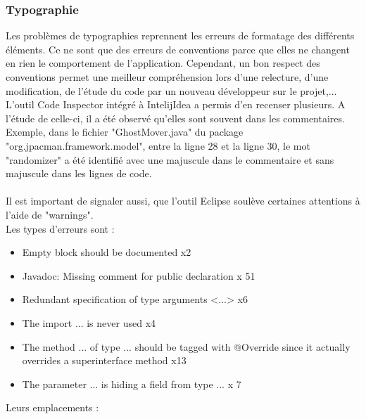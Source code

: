 \documentclass[12pt,a4paper,final]{article}
\begin{document}
\subsubsection{Typographie}
Les problèmes de typographies reprennent les erreurs de formatage des différents éléments. Ce ne sont que des erreurs de conventions parce que elles ne changent en rien le comportement de l'application. Cependant, un bon respect des conventions permet une meilleur compréhension lors d'une relecture, d'une modification, de l'étude du code par un nouveau développeur sur le projet,...\\
L'outil Code Inspector intégré à IntelijIdea a permis d'en recenser plusieurs. A l'étude de celle-ci, il a été observé qu'elles sont souvent dans les commentaires. Exemple, dans le fichier "GhostMover.java" du package "org.jpacman.framework.model", entre la ligne 28 et la ligne 30, le mot "randomizer" a été identifié avec une majuscule dans le commentaire et sans majuscule dans les lignes de code.\\ \\
Il est important de signaler aussi, que l'outil Eclipse soulève certaines attentions à l'aide de "warnings".\\
Les types d'erreurs sont : 
\begin{itemize}
\item Empty block should be documented x2
\item Javadoc: Missing comment for public declaration x 51
\item Redundant specification of type arguments <...> x6
\item The import ... is never used x4
\item The method ... of type ... should be tagged with @Override since it actually overrides a superinterface method x13
\item The parameter ... is hiding a field from type ... x 7
\end {itemize}
Leurs emplacements : \\
\end{document}
